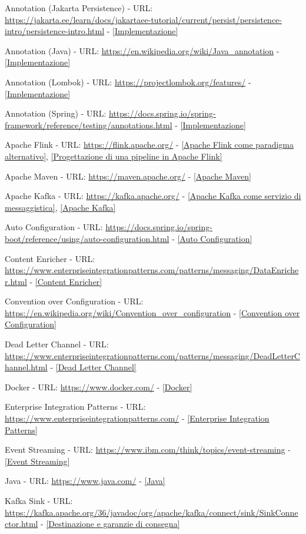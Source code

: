 \begin{description}
    \item Annotation (Jakarta Persistence) - URL: \url{https://jakarta.ee/learn/docs/jakartaee-tutorial/current/persist/persistence-intro/persistence-intro.html} - \ref{Implementazione}
    \item Annotation (Java) - URL: \url{https://en.wikipedia.org/wiki/Java_annotation} - \ref{Implementazione}
    \item Annotation (Lombok) - URL: \url{https://projectlombok.org/features/} - \ref{Implementazione}
    \item Annotation (Spring) - URL: \url{https://docs.spring.io/spring-framework/reference/testing/annotations.html} - \ref{Implementazione}
    \item Apache Flink - URL: \url{https://flink.apache.org/} - \ref{Apache Flink come paradigma alternativo}, \ref{Progettazione di una pipeline in Apache Flink}
    \item Apache Maven - URL: \url{https://maven.apache.org/} - \ref{Apache Maven}
    \item Apache Kafka - URL: \url{https://kafka.apache.org/} - \ref{Apache Kafka come servizio di messaggistica}, \ref{Apache Kafka}
    \item Auto Configuration - URL: \url{https://docs.spring.io/spring-boot/reference/using/auto-configuration.html} - \ref{Auto Configuration}
    \item Content Enricher - URL: \url{https://www.enterpriseintegrationpatterns.com/patterns/messaging/DataEnricher.html} - \ref{Content Enricher}
    \item Convention over Configuration - URL: \url{https://en.wikipedia.org/wiki/Convention_over_configuration} - \ref{Convention over Configuration}
    \item Dead Letter Channel - URL: \url{https://www.enterpriseintegrationpatterns.com/patterns/messaging/DeadLetterChannel.html} - \ref{Dead Letter Channel}
    \item Docker - URL: \url{https://www.docker.com/} - \ref{Docker}
    \item Enterprise Integration Patterns - URL: \url{https://www.enterpriseintegrationpatterns.com/} - \ref{Enterprise Integration Patterns}
    \item Event Streaming - URL: \url{https://www.ibm.com/think/topics/event-streaming} - \ref{Event Streaming}
    \item Java - URL: \url{https://www.java.com/} - \ref{Java}
    \item Kafka Sink - URL: \url{https://kafka.apache.org/36/javadoc/org/apache/kafka/connect/sink/SinkConnector.html} - \ref{Destinazione e garanzie di consegna}

\end{description}
